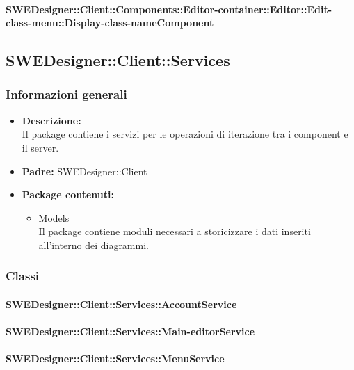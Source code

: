 			\paragraph{SWEDesigner::Client::Components::Editor-container::Editor::Edit-class-menu::Display-class-nameComponent}
				
		
	\subsection{SWEDesigner::Client::Services}
		\subsubsection{Informazioni generali}
			\begin{itemize}
          		\item \textbf{Descrizione:}\\
          		Il package contiene i servizi per le operazioni di iterazione tra i component e il server.
          		\item \textbf{Padre:} SWEDesigner::Client
          		\item \textbf{Package contenuti:}\\
          		\begin{itemize}
          			\item Models\\
          			Il package contiene moduli necessari a storicizzare i dati inseriti all’interno dei diagrammi.
          		\end{itemize}
          	\end{itemize}
          	
          \subsubsection{Classi}
          
          	\paragraph{SWEDesigner::Client::Services::AccountService}
				
				
			\paragraph{SWEDesigner::Client::Services::Main-editorService}
				
				
			\paragraph{SWEDesigner::Client::Services::MenuService}
				